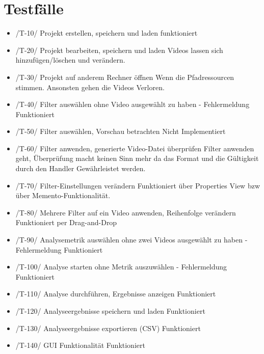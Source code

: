 \section{Testfälle}
\begin{itemize}
\item /T-10/ Projekt erstellen, speichern und laden \newline
funktioniert
\item /T-20/ Projekt bearbeiten, speichern und laden\newline
Videos lassen sich hinzufügen/löschen und verändern.
\item /T-30/ Projekt auf anderem Rechner öffnen\newline
Wenn die Pfadressourcen stimmen. Ansonsten gehen die Videos Verloren.
\item /T-40/ Filter auswählen ohne Video ausgewählt zu haben - Fehlermeldung \newline
Funktioniert
\item /T-50/ Filter auswählen, Vorschau betrachten \newline
Nicht Implementiert
\item /T-60/ Filter anwenden, generierte Video-Datei überprüfen \newline
Filter anwenden geht, Überprüfung macht keinen Sinn mehr da das Format und die Gültigkeit durch den Handler Gewährleistet werden.
\item /T-70/ Filter-Einstellungen verändern \newline
Funktioniert über Properties View bzw über Memento-Funktionalität.
\item /T-80/ Mehrere Filter auf ein Video anwenden, Reihenfolge verändern \newline
Funktioniert per Drag-and-Drop
\item /T-90/ Analysemetrik auswählen ohne zwei Videos ausgewählt zu haben - Fehlermeldung \newline
Funktioniert
\item /T-100/ Analyse starten ohne Metrik auszuwählen - Fehlermeldung \newline
Funktioniert
\item /T-110/ Analyse durchführen, Ergebnisse anzeigen \newline
Funktioniert
\item /T-120/ Analyseergebnisse speichern und laden \newline
Funktioniert
\item /T-130/ Analyseergebnisse exportieren (CSV) \newline
Funktioniert
\item /T-140/ GUI Funktionalität \newline
Funktioniert
\end{itemize}